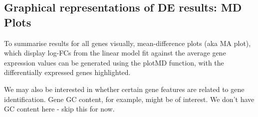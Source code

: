 \documentclass[
]{book}
\begin{document}
\hypertarget{graphical-representations-of-de-results-md-plots-1}{%
\subsection*{Graphical representations of DE results: MD Plots}\label{graphical-representations-of-de-results-md-plots-1}}

To summarise results for all genes visually, mean-difference plots
(aka MA plot), which display log-FCs from the linear model fit against
the average gene expression values can be generated using the plotMD function,
with the differentially expressed genes highlighted.

We may also be interested in whether certain gene features are
related to gene identification. Gene GC content, for example, might be
of interest. We don't have GC content here - skip this for now.
\end{document}
